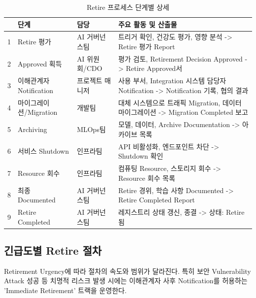 \begin{table}[htbp]
\centering
\caption{Retire 프로세스 단계별 상세}
\label{tab:retirement_process_details}
\begin{tabularx}{\textwidth}{p{0.5cm}p{2cm}p{2.5cm}X}
\toprule
\textbf{} & \textbf{단계} & \textbf{담당} & \textbf{주요 활동 및 산출물} \\
\midrule
1 &
Retire 평가 &
AI 거버넌스팀 &
트리거 확인, 건강도 평가, 영향 분석 -> Retire 평가 Report \\
\midrule
2 &
Approved 획득 &
AI 위원회/CDO &
평가 검토, Retirement Decision Approved -> Retire Approved서 \\
\midrule
3 &
이해관계자 Notification &
프로젝트 매니저 &
사용 부서, Integration 시스템 담당자 Notification -> Notification 기록, 협의 결과 \\
\midrule
4 &
마이그레이션/Migration &
개발팀 &
대체 시스템으로 트래픽 Migration, 데이터 마이그레이션 -> Migration Completed 보고 \\
\midrule
5 &
Archiving &
MLOps팀 &
모델, 데이터, Archive Documentation\cite{zaharia2018accelerating} -> 아카이브\cite{huyen2022designing} 목록 \\
\midrule
6 &
서비스 Shutdown &
인프라팀 &
API 비활성화, 엔드포인트 차단 -> Shutdown 확인 \\
\midrule
7 &
Resource 회수 &
인프라팀 &
컴퓨팅 Resource, 스토리지 회수 -> Resource 회수 목록 \\
\midrule
8 &
최종 Documented &
AI 거버넌스팀 &
Retire 경위, 학습 사항 Documented -> Retire Completed Report \\
\midrule
9 &
Retire Completed &
AI 거버넌스팀 &
레지스트리 상태 갱신, 종결 -> 상태: Retire됨 \\
\bottomrule
\end{tabularx}
\end{table}


\subsection{긴급도별 Retire 절차}
\label{sec:12.2.2}

Retirement Urgency에 따라 절차의 속도와 범위가 달라진다. 특히 보안 Vulnerability Attack 성공 등 치명적 리스크 발생 시에는 이해관계자 사후 Notification를 허용하는 'Immediate Retirement' 트랙을 운영한다.

